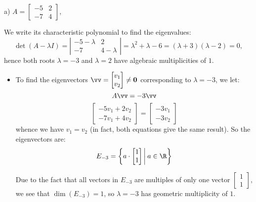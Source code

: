  \bigskip
 \begin{solution}
     a) $A=\begin{bmatrix}
             -5&2\\-7&4
         \end{bmatrix}$,
        
        
         We write its characteristic polynomial to find the eigenvalues:
         \[  \det(A-\lambda I)=\left|\begin{array}{cc}
             -5-\lambda&2\\-7&4-\lambda
         \end{array}\right| =\lambda^2+\lambda-6=(\lambda+3)(\lambda-2)=0, \]
         hence both roots $\lambda = -3$ and $\lambda = 2$ have algebraic multiplicities of $1$.
         \begin{itemize}
             \item To find the eigenvectors $\vv=\begin{bmatrix}
             v_1\\v_2
         \end{bmatrix}\ne \textbf{0}$ corresponding to $\lambda = -3$, we let:
         \[
         A\vv=-3 \vv
         \]
         \[
         \begin{bmatrix}
             -5v_1 + 2v_2 \\ -7v_1 + 4v_2
         \end{bmatrix} = \begin{bmatrix}
             -3v_1 \\ -3v_2
         \end{bmatrix}
         \]
         whence we have $v_1=v_2$ (in fact, both equations give the same result). So the eigenvectors are:
         \[
         E_{-3} = \left\{ a \cdot \begin{bmatrix}
             1 \\ 1
         \end{bmatrix} \bigg\vert\: a\in\R \right\}
         \]

         Due to the fact that all vectors in $E_{-3}$ are multiples of only one vector $\begin{bmatrix}
             1 \\ 1
         \end{bmatrix}$, we see that $\dim(E_{-3})=1$, so $\lambda=-3$ has geometric multiplicity of $1$.


\end{itemize}
\end{solution}
